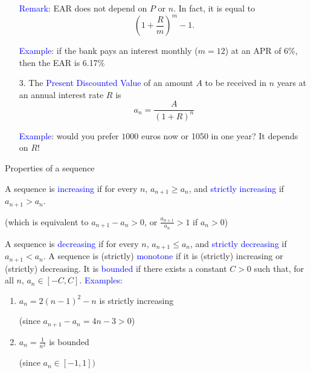 \documentclass[11pt,aspectratio=169]{beamer}
\begin{document}
\begin{frame}{}

\begin{enumerate}
\item[] \textcolor{blue}{Remark}:  EAR does not depend on $P$ or $n$. In fact, it is equal to
$$
\left( 1+\frac{R}{m}\right)^m-1.
$$

\textcolor{blue}{Example}: if the bank pays an interest monthly ($m=12$) at an APR of $6\%$, then the EAR is 6.17$\%$

\vskip 12pt

\item[3.] The \textcolor{blue}{Present Discounted Value} of an amount $A$ to be received in $n$ years at an annual interest rate $R$ is
$$
a_n=\frac{A}{(1+R)^n}
$$

\textcolor{blue}{Example}: would you prefer $1000$ euros now or 1050 in one year? It depends on $R$! \end{enumerate}\end{frame}


\begin{frame}{Properties of a sequence}

 A sequence is  \textcolor{blue}{increasing} if for every $n$, $a_{n+1} \geq a_n$, and \textcolor{blue}{strictly increasing} if $a_{n+1}  >a_n$. \begin{tiny} (which is equivalent to $a_{n+1}-a_n>0$, or $\frac{a_{n+1}}{{a_n}}>1$ if $a_n>0$) \end{tiny}
\vskip 12pt
A sequence is \textcolor{blue}{decreasing} if for every $n$, $a_{n+1} \leq a_n$, and \textcolor{blue}{strictly decreasing} if $a_{n+1}  <a_n$.
\vskip 12pt
A sequence is (strictly) \textcolor{blue}{monotone} if it is (strictly) increasing or (strictly) decreasing.
\vskip 12pt
It is \textcolor{blue}{bounded} if there exists a constant $C>0$ such that,
for all  $n$, $a_{n} \in [-C, C]$.
\vskip 12pt
\textcolor{blue}{Examples:} 
\begin{enumerate}
\item $a_n=2(n-1)^2-n$ is strictly increasing \begin{tiny} (since $a_{n+1}-a_n=4n-3>0$)\end{tiny}

\item $a_n=\frac{1}{n^2}$ is bounded\begin{tiny} (since $a_n \in [-1,1])$\end{tiny}
\end{enumerate}
\end{frame}
\end{document}
